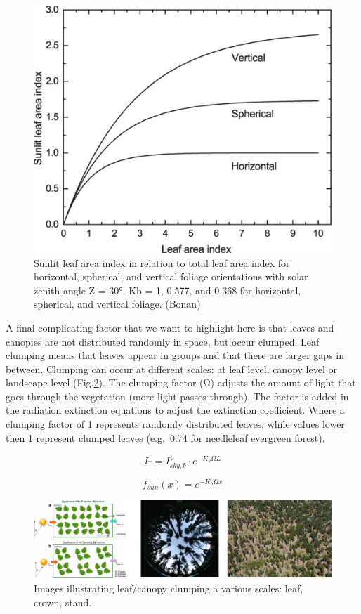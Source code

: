 \documentclass[12pt,oneside]{book}
\begin{document}
\begin{figure}

{\centering \includegraphics[width=0.8\linewidth]{figures/chap3/f314_sunlit} 

}

\caption{Sunlit leaf area index in relation to total leaf area index for horizontal, spherical, and vertical foliage orientations with solar zenith angle Ζ = 30°. Kb = 1, 0.577, and 0.368 for horizontal, spherical, and vertical foliage. (Bonan)}\label{fig:f314}
\end{figure}

A final complicating factor that we want to highlight here is that
leaves and canopies are not distributed randomly in space, but occur
clumped. Leaf clumping means that leaves appear in groups and that there
are larger gaps in between. Clumping can occur at different scales: at
leaf level, canopy level or landscape level (Fig.\ref{fig:f315}). The
clumping factor (Ω) adjusts the amount of light that goes through the
vegetation (more light passes through). The factor is added in the
radiation extinction equations to adjust the extinction coefficient.
Where a clumping factor of 1 represents randomly distributed leaves,
while values lower then 1 represent clumped leaves (e.g.~0.74 for
needleleaf evergreen forest).

\[
I^{\downarrow} = I^{\downarrow}_{sky,b}\cdot e^{-K_b \Omega L}
\]

\[
f_{sun} (x) = e^{-K_b \Omega x}
\]

\begin{figure}

{\centering \includegraphics[width=0.8\linewidth]{figures/chap3/f315_clumping} 

}

\caption{Images illustrating leaf/canopy clumping a various scales: leaf, crown, stand.}\label{fig:f315}
\end{figure}
\end{document}
